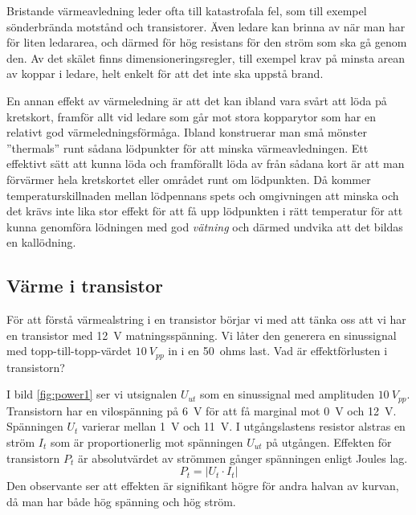 Bristande värmeavledning leder ofta till katastrofala fel, som till exempel
sönderbrända motstånd och transistorer. Även ledare kan brinna av när man
har för liten ledararea, och därmed för hög resistans för den ström som
ska gå genom den. Av det skälet finns dimensioneringsregler, till exempel
krav på minsta arean av koppar i ledare, helt enkelt för att det inte ska
uppstå brand.

En annan effekt av värmeledning är att det kan ibland vara svårt att löda
på kretskort, framför allt vid ledare som går mot stora kopparytor som
har en relativt god värmeledningsförmåga. Ibland konstruerar man små mönster
''thermals'' runt sådana lödpunkter för att minska värmeavledningen.
Ett effektivt sätt att kunna löda och framförallt löda av från sådana
kort är att man förvärmer hela kretskortet eller området runt om
lödpunkten. Då kommer temperaturskillnaden mellan lödpennans spets och
omgivningen att minska och det krävs inte lika stor effekt för att få
upp lödpunkten i rätt temperatur för att kunna genomföra lödningen med god
\emph{vätning} och därmed undvika att det bildas en kallödning.

\newpage %
\subsection{Värme i transistor}

För att förstå värmealstring i en transistor börjar vi med att tänka oss att vi
har en transistor med \SI{12}{\volt} matningsspänning.
Vi låter den generera en sinussignal med topp-till-topp-värdet \(10\ V_{pp}\) in i en 50~ohms last.
Vad är effektförlusten i transistorn?


I bild \ref{fig:power1} ser vi utsignalen \(U_{ut}\) som en sinussignal med
amplituden \(10\ V_{pp}\).
Transistorn har en vilospänning på \SI{6}{\volt} för att få marginal mot
\SI{0}{\volt} och \SI{+12}{\volt}. Spänningen \(U_t\) varierar
mellan \SI{1}{\volt} och \SI{11}{\volt}. I utgångslastens resistor alstras en ström \(I_t\) som är proportionerlig mot spänningen
\(U_{ut}\) på utgången. Effekten för transistorn \(P_t\) är absolutvärdet av strömmen gånger spänningen enligt Joules lag. 
\[P_t = \lvert U_t \cdot I_t \rvert\]
Den observante ser att effekten är signifikant högre för andra halvan av kurvan, då man har både
hög spänning och hög ström.
